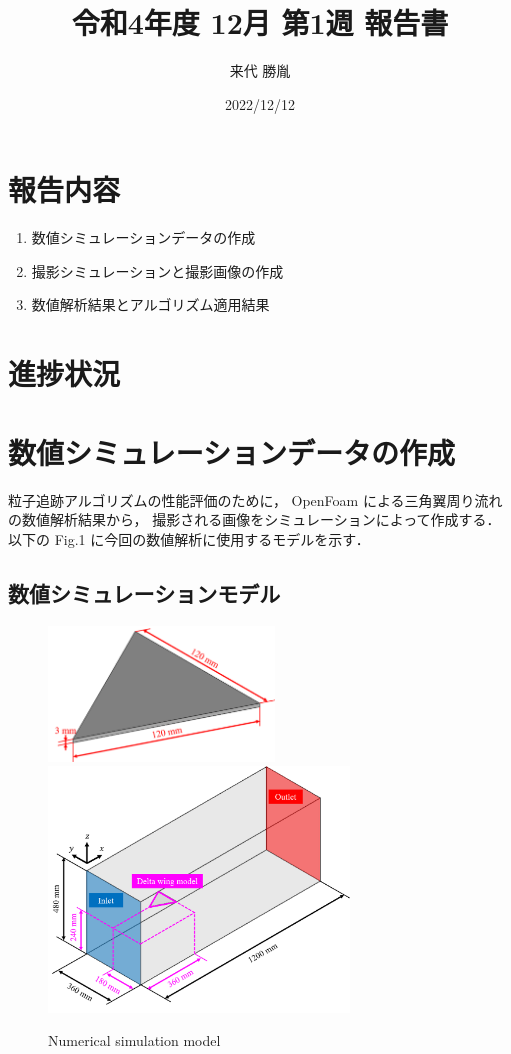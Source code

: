 \documentclass[twocolumn,a4j]{jsarticle}
\author{来代 勝胤}
\title{令和4年度 12月 第1週 報告書}
\date{2022/12/12}
\begin{document}
\columnseprule=0.1mm
\maketitle

\section*{報告内容}
\begin{enumerate}[1.]
  \item 数値シミュレーションデータの作成
  \item 撮影シミュレーションと撮影画像の作成
  \item 数値解析結果とアルゴリズム適用結果
\end{enumerate}

\section*{進捗状況}

\section{数値シミュレーションデータの作成}
粒子追跡アルゴリズムの性能評価のために，
OpenFoam による三角翼周り流れの数値解析結果から，
撮影される画像をシミュレーションによって作成する．
以下の Fig.1 に今回の数値解析に使用するモデルを示す．\\

\subsection{数値シミュレーションモデル}
\begin{figure}[htbp]
  \centering
  {
    \includegraphics[keepaspectratio, width=60mm]{../images/Delta_Wing_Model.png}
    \includegraphics[keepaspectratio, width=80mm]{../images/Model_of_numerical_simulation.png}
  }
  \caption{Numerical simulation model}
\end{figure}
\end{document}
